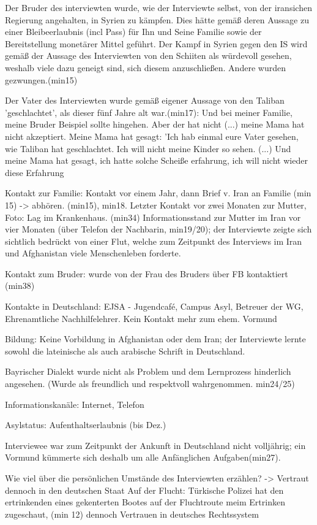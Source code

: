 \documentclass[12pt,oneside]{article}
\begin{document}
Der Bruder des interviewten wurde, wie der Interviewte selbst, von der iransichen Regierung angehalten, in Syrien zu kämpfen. Dies hätte gemäß deren Aussage zu einer Bleibeerlaubnis (incl Pass) für Ihn und Seine Familie sowie der Bereitstellung monetärer Mittel geführt.
Der Kampf in Syrien gegen den IS wird gemäß der Aussage des Interviewten von den Schiiten als würdevoll gesehen, weshalb viele dazu geneigt sind, sich diesem anzuschließen. Andere wurden gezwungen.(min15)

Der Vater des Interviewten wurde gemäß eigener Aussage von den Taliban 'geschlachtet', als dieser fünf Jahre alt war.(min17): Und bei meiner Familie, meine Bruder Beispiel sollte hingehen. Aber der hat nicht (...) meine Mama hat nicht akzeptiert. Meine Mama hat gesagt: 'Ich hab einmal eure Vater gesehen, wie Taliban hat geschlachtet. Ich will nicht meine Kinder so sehen. (...) Und meine Mama hat gesagt, ich hatte solche Scheiße erfahrung, ich will nicht wieder diese Erfahrung 

Kontakt zur Familie: Kontakt vor einem Jahr, dann Brief v. Iran an Familie (min 15) -> abhören. (min15), min18. 
Letzter Kontakt vor zwei Monaten zur Mutter, Foto: Lag im Krankenhaus. (min34) 
Informationsstand zur Mutter im Iran vor vier Monaten (über Telefon der Nachbarin, min19/20); der Interviewte zeigte sich sichtlich bedrückt von einer Flut, welche zum Zeitpunkt des Interviews im Iran und Afghanistan viele Menschenleben forderte.

Kontakt zum Bruder: wurde von der Frau des Bruders über FB kontaktiert (min38)

Kontakte in Deutschland: EJSA - Jugendcafé, Campus Asyl, Betreuer der WG, Ehrenamtliche Nachhilfelehrer. Kein Kontakt mehr zum ehem. Vormund

Bildung: Keine Vorbildung in Afghanistan oder dem Iran; der Interviewte lernte sowohl die lateinische als auch arabische Schrift in Deutschland.

Bayrischer Dialekt wurde nicht als Problem und dem Lernprozess hinderlich angesehen. (Wurde als freundlich und respektvoll wahrgenommen. min24/25)

Informationskanäle: Internet, Telefon

Asylstatus: Aufenthaltserlaubnis (bis Dez.)

Interviewee war zum Zeitpunkt der Ankunft in Deutschland nicht volljährig; ein Vormund kümmerte sich deshalb um alle Anfänglichen Aufgaben(min27).

Wie viel über die persönlichen Umstände des Interviewten erzählen? -> Vertraut dennoch in den deutschen Staat
Auf der Flucht: Türkische Polizei hat den ertrinkenden eines gekenterten Bootes auf der Fluchtroute meim Ertrinken zugeschaut, (min 12) dennoch Vertrauen in deutsches Rechtssystem
\end{document}
